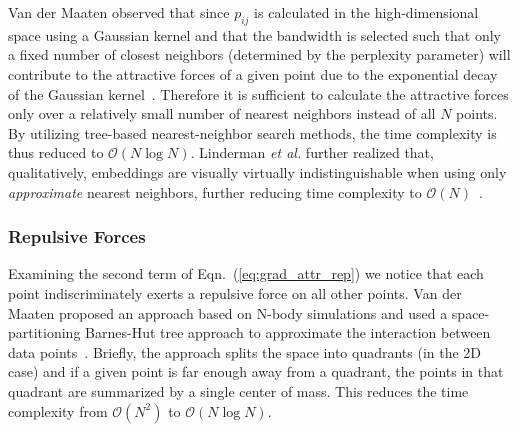 \documentclass[twocolumn]{bmcart}
\begin{document}
Van der Maaten observed that since $p_{ij}$ is calculated in the high-dimensional space using a Gaussian kernel and that the bandwidth is selected such that only a fixed number of closest neighbors (determined by the perplexity parameter) will contribute to the attractive forces of a given point due to the exponential decay of the Gaussian kernel~\cite{van2014accelerating}. Therefore it is sufficient to calculate the attractive forces only over a relatively small number of nearest neighbors instead of all $N$ points. By utilizing tree-based nearest-neighbor search methods, the time complexity is thus reduced to $\mathcal{O}(N \log N)$. Linderman \textit{et al.} further realized that, qualitatively, embeddings are visually virtually indistinguishable when using only \textit{approximate} nearest neighbors, further reducing time complexity to $\mathcal{O}(N)$~\cite{linderman2019fast}.

\subsubsection*{Repulsive Forces}

Examining the second term of Eqn.~(\ref{eq:grad_attr_rep}) we notice that each point indiscriminately exerts a repulsive force on all other points. Van der Maaten proposed an approach based on N-body simulations and used a space-partitioning Barnes-Hut tree approach to approximate the interaction between data points~\cite{van2014accelerating}. Briefly, the approach splits the space into quadrants (in the 2D case) and if a given point is far enough away from a quadrant, the points in that quadrant are summarized by a single center of mass. This reduces the time complexity from $\mathcal{O}(N^2)$ to $\mathcal{O}(N \log N)$.
\end{document}

